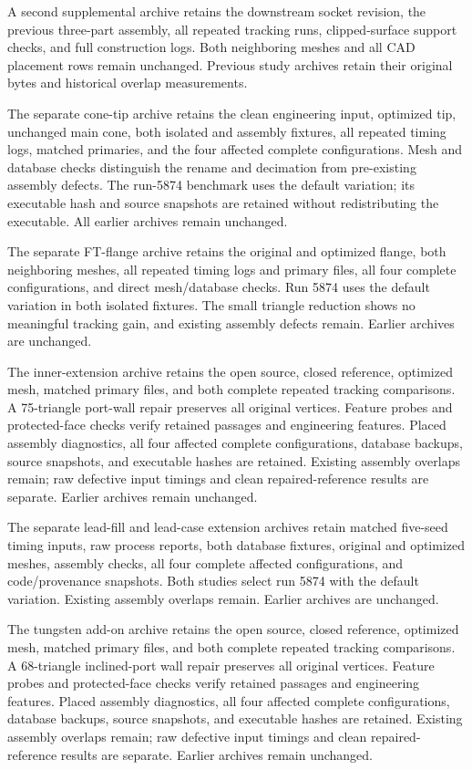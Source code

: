 A second supplemental archive retains the downstream socket revision, the previous three-part assembly, all
repeated tracking runs, clipped-surface support checks, and full construction logs. Both neighboring meshes
and all CAD placement rows remain unchanged. Previous study archives retain their original bytes and
historical overlap measurements.


The separate cone-tip archive retains the clean engineering input, optimized tip, unchanged main cone,
both isolated and assembly fixtures, all repeated timing logs, matched primaries, and the four affected
complete configurations. Mesh and database checks distinguish the rename and decimation from pre-existing
assembly defects. The run-5874 benchmark uses the default variation; its executable hash and source
snapshots are retained without redistributing the executable. All earlier archives remain unchanged.


The separate FT-flange archive retains the original and optimized flange, both neighboring meshes,
all repeated timing logs and primary files, all four complete configurations, and direct mesh/database
checks. Run 5874 uses the default variation in both isolated fixtures. The small triangle reduction
shows no meaningful tracking gain, and existing assembly defects remain. Earlier archives are unchanged.


The inner-extension archive retains the open source, closed reference, optimized mesh, matched primary
files, and both complete repeated tracking comparisons. A 75-triangle port-wall repair preserves all
original vertices. Feature probes and protected-face checks verify retained passages and engineering
features. Placed assembly diagnostics, all four affected complete configurations, database backups,
source snapshots, and executable hashes are retained. Existing assembly overlaps remain; raw defective
input timings and clean repaired-reference results are separate. Earlier archives remain unchanged.


The separate lead-fill and lead-case extension archives retain matched five-seed timing inputs, raw process
reports, both database fixtures, original and optimized meshes, assembly checks, all four complete affected
configurations, and code/provenance snapshots. Both studies select run 5874 with the default variation.
Existing assembly overlaps remain. Earlier archives are unchanged.


The tungsten add-on archive retains the open source, closed reference, optimized mesh, matched primary
files, and both complete repeated tracking comparisons. A 68-triangle inclined-port wall repair preserves all
original vertices. Feature probes and protected-face checks verify retained passages and engineering
features. Placed assembly diagnostics, all four affected complete configurations, database backups,
source snapshots, and executable hashes are retained. Existing assembly overlaps remain; raw defective
input timings and clean repaired-reference results are separate. Earlier archives remain unchanged.


